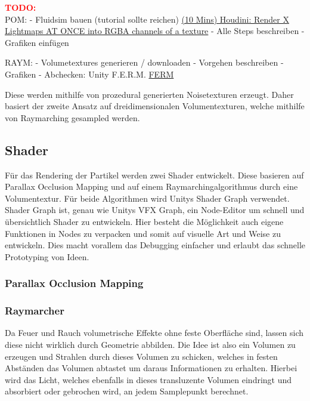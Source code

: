 \huge\textcolor{red}{\textbf{TODO:}} \\
POM: 
- Fluidsim bauen (tutorial sollte reichen) \href{https://www.youtube.com/watch?v=6bACPGpfItU&t=20s}{(10 Mins) Houdini: Render X Lightmaps AT ONCE into RGBA channels of a texture}
- Alle Steps beschreiben
- Grafiken einfügen

RAYM: 
- Volumetextures generieren / downloaden
- Vorgehen beschreiben
- Grafiken 
- Abchecken: Unity F.E.R.M. \href{https://forum.unity.com/threads/released-f-e-r-m-toolkit-fast-easy-raymarching-in-unity.655960/}{FERM}


Diese werden mithilfe von prozedural generierten Noisetexturen erzeugt. 
Daher basiert der zweite Ansatz auf dreidimensionalen Volumentexturen, welche mithilfe von Raymarching gesampled werden. 


\subsection{Shader}
Für das Rendering der Partikel werden zwei Shader entwickelt. Diese basieren auf Parallax Occlusion Mapping und auf einem Raymarchingalgorithmus
durch eine Volumentextur. Für beide Algorithmen wird Unitys Shader Graph verwendet. Shader Graph ist, genau wie Unitys VFX Graph, ein Node-Editor um 
schnell und übersichtlich Shader zu entwickeln. Hier besteht die Möglichkeit auch eigene Funktionen in Nodes zu verpacken und somit auf visuelle Art und Weise zu entwickeln. 
Dies macht vorallem das Debugging einfacher und erlaubt das schnelle Prototyping von Ideen. 


\subsubsection{Parallax Occlusion Mapping}


\subsubsection{Raymarcher}

Da Feuer und Rauch volumetrische Effekte ohne feste Oberfläche sind, lassen sich diese nicht wirklich durch Geometrie abbilden. Die Idee ist also ein 
Volumen zu erzeugen und Strahlen durch dieses Volumen zu schicken, welches in festen Abständen das Volumen abtastet um daraus Informationen zu erhalten.
Hierbei wird das Licht, welches ebenfalls in dieses transluzente Volumen eindringt und absorbiert oder gebrochen wird, an jedem Samplepunkt berechnet.

